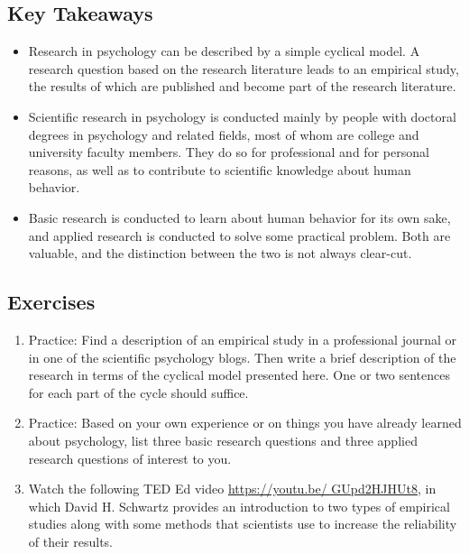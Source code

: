 \subsection{Key Takeaways}
\begin{fullwidth}
\begin{itemize}
\item Research in psychology can be described by a simple cyclical model. A research question based on the research literature leads to an empirical study, the results of which are published and become part of the research literature.
\item Scientific research in psychology is conducted mainly by people with doctoral degrees in psychology and related fields, most of whom are college and university faculty members. They do so for professional and for personal reasons, as well as to contribute to scientific knowledge about human behavior.
\item Basic research is conducted to learn about human behavior for its own sake, and applied research is conducted to solve some practical problem. Both are valuable, and the distinction between the two is not always clear-cut.
\end{itemize}
\end{fullwidth}

\subsection{Exercises}
\begin{fullwidth}
\begin{enumerate}
\item Practice: Find a description of an empirical study in a professional journal or in one of the scientific psychology blogs. Then write a brief description of the research in terms of the cyclical model presented here. One or two sentences for each part of the cycle should suffice.
\item Practice: Based on your own experience or on things you have already learned about psychology, list three basic research questions and three applied research questions of interest to you.
\item Watch the following TED Ed video \url{https://youtu.be/ GUpd2HJHUt8}, in which David H. Schwartz provides an introduction to two types of empirical studies along with some methods that scientists use to increase the reliability of their results.
\end{enumerate}
\end{fullwidth}

